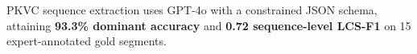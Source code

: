 %

%
%


PKVC sequence extraction uses GPT-4o with a constrained JSON schema, attaining \textbf{93.3\% dominant accuracy} and \textbf{0.72 sequence-level LCS-F1} on 15 expert-annotated gold segments.


